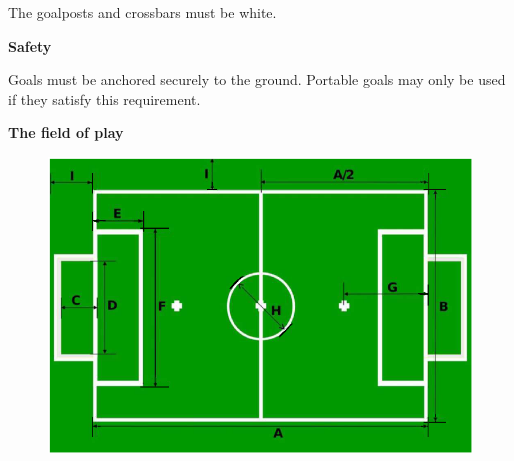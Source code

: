 \bigskip

The goalposts and crossbars must be white.

\bigskip

{\bfseries Safety}

\headlinebox

Goals must be anchored securely to the ground. Portable goals may only be used if they satisfy this requirement.

\bigskip

{\bfseries The field of play}

\headlinebox 

\begin{center}
\begin{figure}[h]
\includegraphics[width=\textwidth]{img/field.png}
\caption{}
\end{figure}
\end{center}
\begin{figure}[h]
  \centering
  
  \caption{}
\end{figure}
\begin{figure}[h]
  \centering
  
  \caption{}
\end{figure}
\newpage

